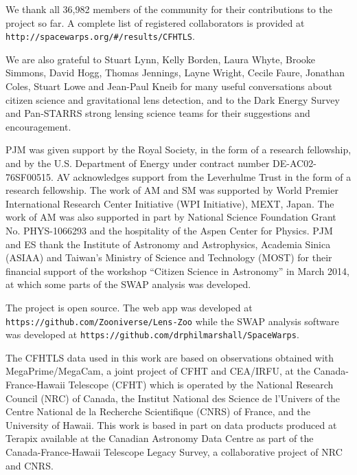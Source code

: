 We thank all 36,982 members of the \sw community for their
contributions to the project so far. A complete list of registered
collaborators is provided at \texttt{http://spacewarps.org/\#/results/CFHTLS}.

We are also grateful to Stuart Lynn, Kelly Borden, Laura Whyte, Brooke Simmons,
David Hogg, Thomas Jennings, Layne  Wright, Cecile Faure, Jonathan Coles, Stuart
Lowe and Jean-Paul Kneib for many useful conversations about citizen science and
gravitational lens detection, and to the Dark Energy Survey and Pan-STARRS strong
lensing science teams for their suggestions and encouragement.

PJM was given support by the Royal Society, in the form of a research
fellowship, and by the U.S. Department of Energy under contract number DE-AC02-76SF00515.
%
AV acknowledges support from the Leverhulme Trust in the form of a research
fellowship.
%
The work of AM and SM was supported by World Premier International Research
Center Initiative (WPI Initiative), MEXT, Japan. The work of AM was also supported in
part by National Science Foundation Grant No. PHYS-1066293 and the hospitality
of the Aspen Center for Physics.
%
%
PJM and ES thank the Institute of Astronomy and Astrophysics, Academia Sinica
(ASIAA) and Taiwan's Ministry of Science and Technology (MOST) for their
financial support of the workshop ``Citizen Science in Astronomy'' in March
2014, at which some parts of the SWAP analysis was developed.

The \sw project is open source.
The web app was developed at \texttt{https://github.com/Zooniverse/Lens-Zoo}
while the SWAP analysis software was developed at
\texttt{https://github.com/drphilmarshall/SpaceWarps}.

The CFHTLS data used in this work are based on observations obtained with
MegaPrime/MegaCam, a joint project of CFHT and CEA/IRFU, at the
Canada-France-Hawaii Telescope (CFHT) which is operated by the National Research
Council (NRC) of Canada, the Institut National des Science de l'Univers of the
Centre National de la Recherche Scientifique (CNRS) of France, and the
University of Hawaii. This work is based in part on data products produced at
Terapix available at the Canadian Astronomy Data Centre as part of the
Canada-France-Hawaii Telescope Legacy Survey, a collaborative project of NRC and
CNRS.
